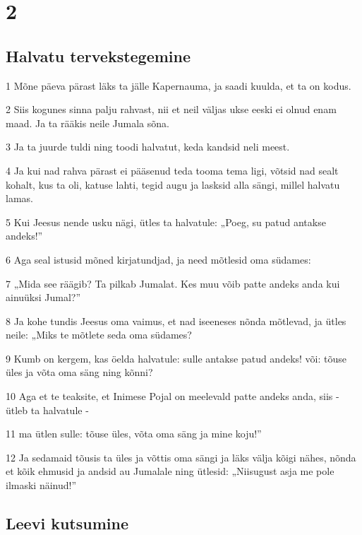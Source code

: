 \chapter{2}

\section*{Halvatu tervekstegemine}

\par 1 Mõne päeva pärast läks ta jälle Kapernauma, ja saadi kuulda, et ta on kodus.
\par 2 Siis kogunes sinna palju rahvast, nii et neil väljas ukse eeski ei olnud enam maad. Ja ta rääkis neile Jumala sõna.
\par 3 Ja ta juurde tuldi ning toodi halvatut, keda kandsid neli meest.
\par 4 Ja kui nad rahva pärast ei pääsenud teda tooma tema ligi, võtsid nad sealt kohalt, kus ta oli, katuse lahti, tegid augu ja lasksid alla sängi, millel halvatu lamas.
\par 5 Kui Jeesus nende usku nägi, ütles ta halvatule: „Poeg, su patud antakse andeks!”
\par 6 Aga seal istusid mõned kirjatundjad, ja need mõtlesid oma südames:
\par 7 „Mida see räägib? Ta pilkab Jumalat. Kes muu võib patte andeks anda kui ainuüksi Jumal?”
\par 8 Ja kohe tundis Jeesus oma vaimus, et nad iseeneses nõnda mõtlevad, ja ütles neile: „Miks te mõtlete seda oma südames?
\par 9 Kumb on kergem, kas öelda halvatule: sulle antakse patud andeks! või: tõuse üles ja võta oma säng ning kõnni?
\par 10 Aga et te teaksite, et Inimese Pojal on meelevald patte andeks anda, siis - ütleb ta halvatule -
\par 11 ma ütlen sulle: tõuse üles, võta oma säng ja mine koju!”
\par 12 Ja sedamaid tõusis ta üles ja võttis oma sängi ja läks välja kõigi nähes, nõnda et kõik ehmusid ja andsid au Jumalale ning ütlesid: „Niisugust asja me pole ilmaski näinud!”

\section*{Leevi kutsumine}


